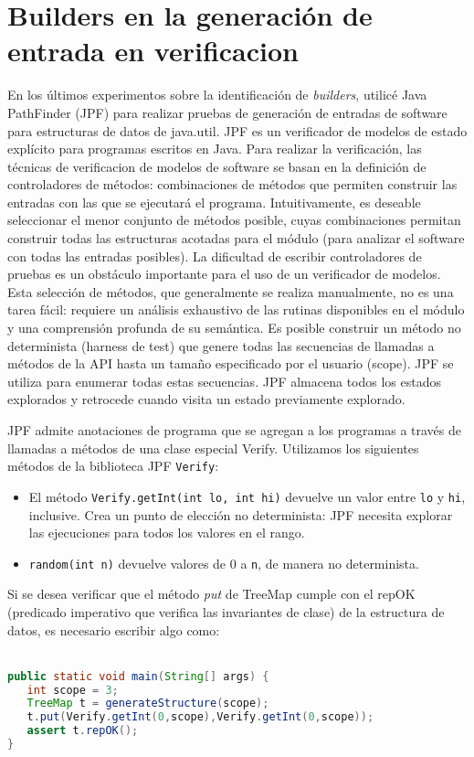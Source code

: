 \section{Builders en la generación de entrada en verificacion}

En los últimos experimentos sobre la identificación de \emph{builders}, utilicé Java PathFinder \cite{Visser:2005} (JPF) para realizar pruebas de generación de entradas de software para estructuras de datos de java.util. JPF es un verificador de modelos de estado explícito para programas escritos en Java. Para realizar la verificación, las técnicas de verificacion de modelos de software se basan en la definición de controladores de métodos: combinaciones de métodos que permiten construir las entradas con las que se ejecutará el programa. Intuitivamente, es deseable seleccionar el menor conjunto de métodos posible, cuyas combinaciones permitan construir todas las estructuras acotadas para el módulo (para analizar el software con todas las entradas posibles). La dificultad de escribir controladores de pruebas es un obstáculo importante para el uso de un verificador de modelos. Esta selección de métodos, que generalmente se realiza manualmente, no es una tarea fácil: requiere un análisis exhaustivo de las rutinas disponibles en el módulo y una comprensión profunda de su semántica.
Es posible construir un método no determinista (harness de test) que genere todas las secuencias de llamadas a métodos de la API hasta un tamaño especificado por el usuario (scope). JPF se utiliza para enumerar todas estas secuencias. JPF almacena todos los estados explorados y retrocede cuando visita un estado previamente explorado.

JPF admite anotaciones de programa que se agregan a los programas a través de llamadas a métodos de una clase especial Verify.
Utilizamos los siguientes métodos de la biblioteca JPF \verb"Verify":
\\
\begin{itemize}
\item El método \verb"Verify.getInt(int lo, int hi)" devuelve un valor entre \verb"lo" y \verb"hi", inclusive. Crea un punto de elección no determinista: JPF necesita explorar las ejecuciones para todos los valores en el rango.
\item \verb"random(int n)" devuelve valores de 0 a \verb"n", de manera no determinista.
\end{itemize}

Si se desea verificar que el método \emph{put}  de TreeMap cumple con el repOK (predicado imperativo que verifica las invariantes de clase) de la estructura de datos, es necesario escribir algo como:
\\
\\
\begin{lstlisting}[caption={Probando el método put de TreeMap con JPF},label={lst:label},language=Java,captionpos=b]
public static void main(String[] args) {
   int scope = 3;
   TreeMap t = generateStructure(scope);
   t.put(Verify.getInt(0,scope),Verify.getInt(0,scope));
   assert t.repOK();
}
\end{lstlisting}

